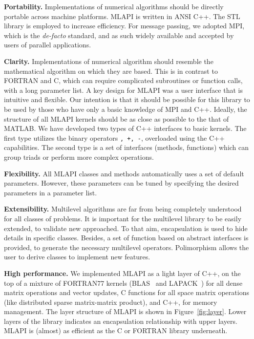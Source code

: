 \documentclass{article}[11pt]
\newcommand{\MLAPI}  {{\sc MLAPI }}
\begin{document}
\bigskip

\noindent
{\bf Portability.} Implementations of numerical algorithms should be
directly portable across machine platforms.
\MLAPI is written in ANSI C++. The STL library is
employed to increase efficiency. For message
passing, we adopted MPI, which is the {\em de-facto} standard, and as such
widely available and accepted by users of parallel applications.

\bigskip

\noindent
{\bf Clarity.} Implementations of numerical algorithm should resemble
the mathematical algorithm on which they are based. This is in contrast to
FORTRAN and C, which can require complicated subroutines or function calls,
  with a long parameter list.
A key design for \MLAPI was a user interface that is
intuitive and flexible. Our intention is that it should be possible for this
library to be used by those who have only a basic knowledge of MPI and C++.
Ideally, the structure of all \MLAPI kernels should be as close as possible to
the that of MATLAB. We have developed two types of C++ interfaces to basic
kernels. The first type utilizes the binary operators {\tt *, +, -},
  overloaded using the C++ capabilities. The second type is a set of
  interfaces (methods, functions) which can group triads or perform more
  complex operations.

\bigskip

\noindent
{\bf Flexibility.} All \MLAPI classes and methods automatically uses a set of
default parameters. However, these parameters can be tuned by specifying the
desired parameters in a parameter list.

\bigskip

\noindent
{\bf Extensibility.} Multilevel algorithms are far from being completely
understood for all classes of problems. It is important for the multilevel
library to be easily extended, to validate new approached. To that aim,
encapsulation is used to hide details in
specific classes. Besides, a set of function based on abstract interfaces
is provided, to generate the necessary multilevel operators. Polimorphism
allows the user to derive classes to implement new features.

\bigskip

\noindent
{\bf High performance.} We implemented \MLAPI as a light layer of
C++, on the top of
a mixture of FORTRAN77 kernels (BLAS~\cite{dongarra90set} and
                                LAPACK~\cite{demmel89lapack}) 
for all dense matrix
operations and vector updates, C functions for all space matrix operations
(like distributed sparse matrix-matrix product), and C++, for memory
management. The layer
structure of \MLAPI is shown in Figure~\ref{fig:layer}. Lower layers of the
library indicates an encapsulation relationship with upper layers.
\MLAPI is (almost) as
efficient as the C or FORTRAN library underneath.
\end{document}

